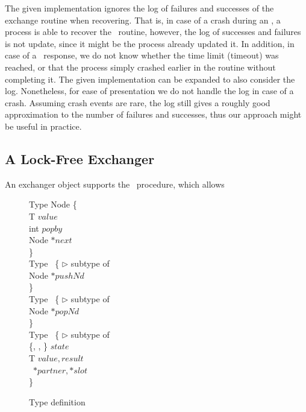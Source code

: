 The given implementation ignores the log of failures and successes of the exchange routine when recovering. That is, in case of a crash during an \exchange, a process is able to recover the \exchange\ routine, however, the log of successes and failures is not update, since it might be the process already updated it. In addition, in case of a \fail\ response, we do not know whether the time limit (timeout) was reached, or that the process simply crashed earlier in the routine without completing it. The given implementation can be expanded to also consider the log. Nonetheless, for ease of presentation we do not handle the log in case of a crash. Assuming crash events are rare, the log still gives a roughly good approximation to the number of failures and successes, thus our approach might be useful in practice.

\subsection{A Lock-Free Exchanger}
An exchanger object supports the \exchange\ procedure, which allows 



\begin{figure*}[b]
	\small
	
	Type Node \{ \\
		\hspace*{6mm} T $value$ \\
		\hspace*{6mm} int $popby$ \\
		\hspace*{6mm} Node $*next$ \\
	\} \\
	
	
	Type \pushInfo\ \{ \hspace*{20.0mm} $\triangleright$ subtype of \Info \\
		\hspace*{6mm} Node $*pushNd$ \\
	\} \\
	
	Type \popInfo\ \{ \hspace*{22.0mm} $\triangleright$ subtype of \Info \\
		\hspace*{6mm} Node $*popNd$ \\
	\} \\
	
	
	Type \exInfo\ \{ \hspace*{24.0mm} $\triangleright$ subtype of \Info \\
	\hspace*{6mm} \{\emptyst, \waiting, \busy\} $state$ \\
	\hspace*{6mm} T $value, result$ \\
	\hspace*{6mm} \exInfo\ $*partner, *slot$ \\
	\}
	
	\caption{Type definition}
\end{figure*}



